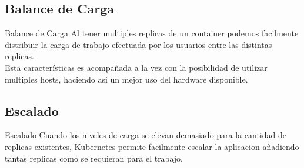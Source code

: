 \documentclass{beamer}
\begin{document}
\subsection{Balance de Carga}

\begin{frame}{Balance de Carga}
	Al tener multiples replicas de un container podemos facilmente distribuir la carga de trabajo efectuada por los usuarios entre las distintas replicas. \\
	\vspace{.3cm}
	Esta características es acompañada a la vez con la posibilidad de utilizar multiples hosts, haciendo asi un mejor uso del hardware disponible.
\end{frame}


\subsection{Escalado}

\begin{frame}{Escalado}
	\hspace{.3cm}Cuando los niveles de carga se elevan demasiado para la cantidad de replicas existentes, Kubernetes permite facilmente escalar la aplicacion
	añadiendo tantas replicas como se requieran para el trabajo.
\end{frame}
\end{document}
